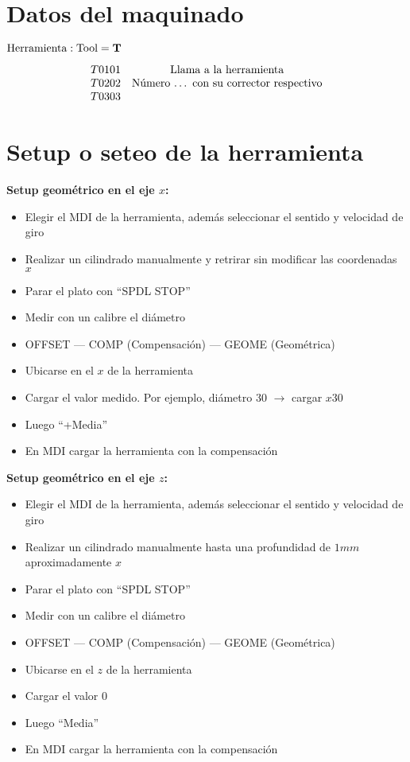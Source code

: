 \documentclass{article}
\begin{document}
\section{Datos del maquinado}
\begin{center}
    $\textnormal{Herramienta} : \textnormal{Tool} = \textbf{T}$
\end{center}
\begin{equation*}
    \begin{matrix}
        T0101 & \textnormal{Llama a la herramienta}                     \\
        T0202 & \textnormal{Número $\dots$ con su corrector respectivo} \\
        T0303\end{matrix}
\end{equation*}

\section{Setup o seteo de la herramienta}

\textbf{Setup geométrico en el eje $x$:}
\begin{itemize}
    \item Elegir el MDI de la herramienta, además seleccionar el sentido y velocidad de
          giro
    \item Realizar un cilindrado manualmente y retrirar sin modificar las coordenadas $x$
    \item Parar el plato con ``SPDL STOP''
    \item Medir con un calibre el diámetro
    \item OFFSET --- COMP (Compensación) --- GEOME (Geométrica)
    \item Ubicarse en el $x$ de la herramienta
    \item Cargar el valor medido. Por ejemplo, diámetro 30 $\longrightarrow$ cargar $x30$
    \item Luego ``+Media''
    \item En MDI cargar la herramienta con la compensación
\end{itemize}

\textbf{Setup geométrico en el eje $z$:}
\begin{itemize}
    \item Elegir el MDI de la herramienta, además seleccionar el sentido y velocidad de
          giro
    \item Realizar un cilindrado manualmente hasta una profundidad de $1mm$
          aproximadamente $x$
    \item Parar el plato con ``SPDL STOP''
    \item Medir con un calibre el diámetro
    \item OFFSET --- COMP (Compensación) --- GEOME (Geométrica)
    \item Ubicarse en el $z$ de la herramienta
    \item Cargar el valor 0
    \item Luego ``Media''
    \item En MDI cargar la herramienta con la compensación
\end{itemize}
\end{document}
